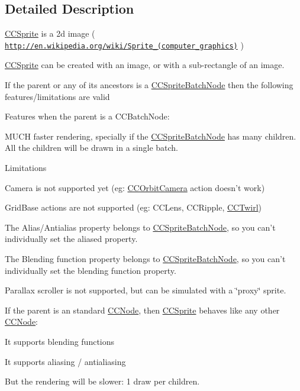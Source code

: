 \subsection{Detailed Description}
\hyperlink{class_c_c_sprite}{C\-C\-Sprite} is a 2d image ( \href{http://en.wikipedia.org/wiki/Sprite_(computer_graphics)}{\tt http\-://en.\-wikipedia.\-org/wiki/\-Sprite\-\_\-(computer\-\_\-graphics)} )

\hyperlink{class_c_c_sprite}{C\-C\-Sprite} can be created with an image, or with a sub-\/rectangle of an image.

If the parent or any of its ancestors is a \hyperlink{interface_c_c_sprite_batch_node}{C\-C\-Sprite\-Batch\-Node} then the following features/limitations are valid
\begin{DoxyItemize}
\item Features when the parent is a C\-C\-Batch\-Node\-:
\begin{DoxyItemize}
\item M\-U\-C\-H faster rendering, specially if the \hyperlink{interface_c_c_sprite_batch_node}{C\-C\-Sprite\-Batch\-Node} has many children. All the children will be drawn in a single batch.
\end{DoxyItemize}
\end{DoxyItemize}


\begin{DoxyItemize}
\item Limitations
\begin{DoxyItemize}
\item Camera is not supported yet (eg\-: \hyperlink{interface_c_c_orbit_camera}{C\-C\-Orbit\-Camera} action doesn't work)
\item Grid\-Base actions are not supported (eg\-: C\-C\-Lens, C\-C\-Ripple, \hyperlink{interface_c_c_twirl}{C\-C\-Twirl})
\item The Alias/\-Antialias property belongs to \hyperlink{interface_c_c_sprite_batch_node}{C\-C\-Sprite\-Batch\-Node}, so you can't individually set the aliased property.
\item The Blending function property belongs to \hyperlink{interface_c_c_sprite_batch_node}{C\-C\-Sprite\-Batch\-Node}, so you can't individually set the blending function property.
\item Parallax scroller is not supported, but can be simulated with a \char`\"{}proxy\char`\"{} sprite.
\end{DoxyItemize}
\end{DoxyItemize}

If the parent is an standard \hyperlink{class_c_c_node}{C\-C\-Node}, then \hyperlink{class_c_c_sprite}{C\-C\-Sprite} behaves like any other \hyperlink{class_c_c_node}{C\-C\-Node}\-:
\begin{DoxyItemize}
\item It supports blending functions
\item It supports aliasing / antialiasing
\item But the rendering will be slower\-: 1 draw per children.
\end{DoxyItemize}

